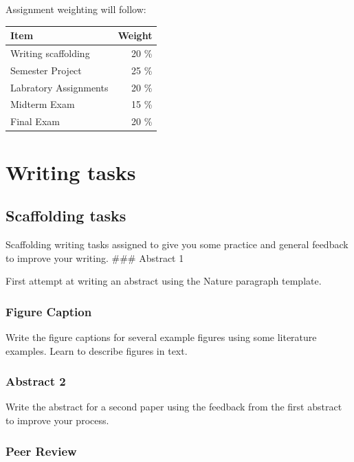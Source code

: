 \documentclass[11pt,]{article}
\begin{document}
Assignment weighting will follow:

\begin{longtable}[]{@{}lr@{}}
\toprule\noalign{}
Item & Weight \\
\midrule\noalign{}
\endhead
\bottomrule\noalign{}
\endlastfoot
Writing scaffolding & 20 \% \\
Semester Project & 25 \% \\
Labratory Assignments & 20 \% \\
Midterm Exam & 15 \% \\
Final Exam & 20 \% \\
\end{longtable}

\newpage

\hypertarget{writing-tasks}{%
\section{Writing tasks}\label{writing-tasks}}

\hypertarget{scaffolding-tasks}{%
\subsection{Scaffolding tasks}\label{scaffolding-tasks}}

Scaffolding writing tasks assigned to give you some practice and general
feedback to improve your writing. \#\#\# Abstract 1

First attempt at writing an abstract using the Nature paragraph
template.

\hypertarget{figure-caption}{%
\subsubsection{Figure Caption}\label{figure-caption}}

Write the figure captions for several example figures using some
literature examples. Learn to describe figures in text.

\hypertarget{abstract-2}{%
\subsubsection{Abstract 2}\label{abstract-2}}

Write the abstract for a second paper using the feedback from the first
abstract to improve your process.

\hypertarget{peer-review}{%
\subsubsection{Peer Review}\label{peer-review}}
\end{document}
